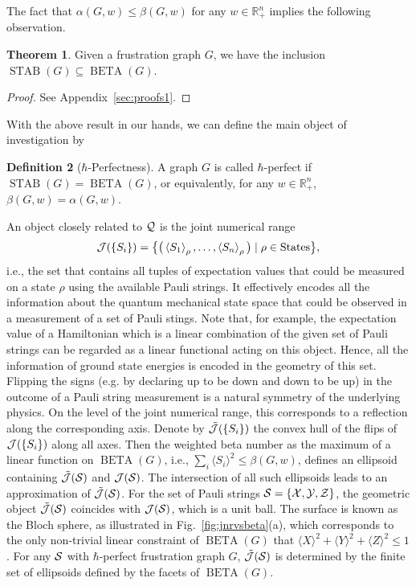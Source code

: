 \documentclass[
12pt,
prx,
aps,
reprint,
a4paper,
longbibliograph,
nofootinbib,
nobibnotes,
superscriptaddress
]{revtex4-2}
\theoremstyle{definition}
\newtheorem{theorem}{Theorem}
\newtheorem{definition}[theorem]{Definition}
\newcommand\mean[1]{\left\langle #1 \right\rangle}
\def\stab{\operatorname{STAB}}
\def\be{\operatorname{BETA}}
\begin{document}
The fact that $\alpha(G,w) \le \beta(G,w)$ for any $w \in \mathbb{R}_+^n$ implies the following observation.
\begin{theorem}
\label{ob:stabbe}
    Given a frustration graph $G$, we have the inclusion
	$\stab(G) \subseteq \be(G)$.
\end{theorem}
\begin{proof}
    See Appendix~\ref{sec:proofs1}.
\end{proof}
With the above result in our hands, we can define the main object of investigation by 
\begin{definition}[$\hbar$-Perfectness]
\label{basicdef}
    A graph $G$ is called $\hbar$-perfect if 
    $\stab(G) = \be(G)$, or equivalently, for any $w\in \mathbb{R}_+^n$,
       $\beta(G,w) = \alpha(G,w)$.
\end{definition}
An  object closely related to $\cal{Q}$ is the joint numerical range 
\begin{equation}
{\cal J}(\{S_i\}) =  \big\{ \big(\mean{S_1}_{\rho}, \dots, \mean{S_n}_{\rho} \big) \mid \rho\in \text{States} \big\},
\end{equation}
i.e., the set that contains all tuples of expectation values that could be measured on a state $\rho$ using the available Pauli strings. It effectively encodes all the information about the quantum mechanical state space that could be observed in a measurement of a set of Pauli stings. Note that, for example, the expectation value of a Hamiltonian which is a linear combination of the given set of Pauli strings can be regarded as a linear functional acting on this object. Hence, all the information of ground state energies is encoded in the geometry of this set. 
Flipping the signs (e.g. by declaring up to be down and down to be up) in the outcome of a Pauli string measurement is a natural symmetry of the underlying physics. On the level of the joint numerical range, this corresponds to a reflection along the corresponding axis. 
Denote by $\tilde{\cal J}(\{S_i\})$ the convex hull of the flips of ${\cal J}(\{S_i\})$ along all axes.
Then the weighted beta number as the maximum of a linear function on $\be(G)$, i.e., $\sum_i \langle S_i\rangle^2 \le \beta(G,w)$, defines an ellipsoid containing $\tilde{\cal J}({\cal S})$ and ${\cal J}({\cal S})$. The intersection of all such ellipsoids leads to an approximation of $\tilde{\cal J}({\cal S})$. 
For the set of Pauli strings $\cal S = \{X, Y, Z\}$, the geometric object $\tilde{\cal J}({\cal S})$ coincides with ${\cal J}({\cal S})$, which is a unit ball. The surface is known as the Bloch sphere, as illustrated in Fig.~\ref{fig:jnrvsbeta}(a), which corresponds to the only non-trivial linear constraint of $\be(G)$ that $\langle X\rangle^2+\langle Y\rangle^2+\langle Z\rangle^2 \le 1$. For any ${\cal S}$ with $\hbar$-perfect frustration graph $G$, $\tilde{\cal J}({\cal S})$ is determined by the finite set of ellipsoids defined by the facets of $\be(G)$.
\end{document}
